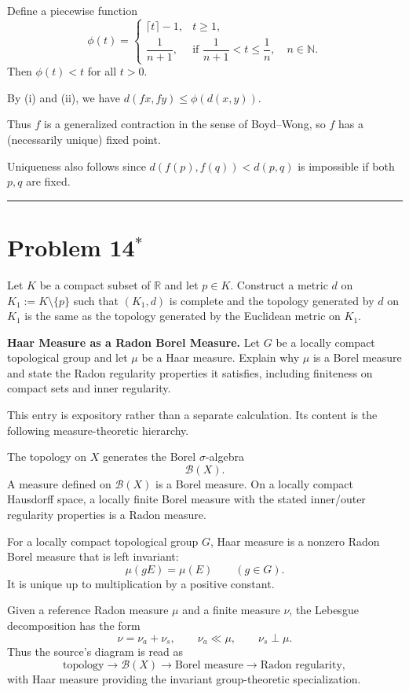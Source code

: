 \begin{solution}
Define a piecewise function
\[
\phi(t)=
\begin{cases}
	\lceil t\rceil - 1, & t\ge 1,\\[3pt]
	\dfrac{1}{n+1}, & \text{if } \dfrac{1}{n+1}<t\le \dfrac{1}{n},\quad n\in\mathbb N.
\end{cases}
\]
Then $\phi(t)<t$ for all $t>0$.

By (i) and (ii), we have $d(fx,fy)\le \phi(d(x,y))$.

Thus $f$ is a generalized contraction in the sense of Boyd--Wong, so
$f$ has a (necessarily unique) fixed point.

Uniqueness also follows since
$d(f(p),f(q))<d(p,q)$ is impossible if both $p,q$ are fixed.

\bigskip
\hrule
\bigskip

\section*{Problem 14$^{\ast}$}
Let $K$ be a compact subset of $\mathbb{R}$ and let $p\in K$. Construct a metric $d$ on
$K_1:=K\setminus\{p\}$ such that $(K_1,d)$ is complete and the topology generated by $d$ on $K_1$
is the same as the topology generated by the Euclidean metric on $K_1$.
\end{solution}

\begin{problem}[CP-II-0393]
\label{prob:cp-ii-0393}
\textbf{Haar Measure as a Radon Borel Measure.}
Let \(G\) be a locally compact topological group and let \(\mu\) be a Haar measure. Explain why \(\mu\) is a Borel measure and state the Radon regularity properties it satisfies, including finiteness on compact sets and inner regularity.
\end{problem}

\begin{solution}
This entry is expository rather than a separate calculation. Its content is the following
measure-theoretic hierarchy.

The topology on \(X\) generates the Borel \(\sigma\)-algebra
\[
\mathcal B(X).
\]
A measure defined on \(\mathcal B(X)\) is a Borel measure. On a locally compact Hausdorff
space, a locally finite Borel measure with the stated inner/outer regularity properties is
a Radon measure.

For a locally compact topological group \(G\), Haar measure is a nonzero Radon Borel measure
that is left invariant:
\[
\mu(gE)=\mu(E)
\qquad(g\in G).
\]
It is unique up to multiplication by a positive constant.

Given a reference Radon measure \(\mu\) and a finite measure \(\nu\), the Lebesgue
decomposition has the form
\[
\boxed{
\nu=\nu_a+\nu_s,
\qquad
\nu_a\ll\mu,
\qquad
\nu_s\perp\mu.
}
\]
Thus the source's diagram is read as
\[
\boxed{
\text{topology}
\longrightarrow
\mathcal B(X)
\longrightarrow
\text{Borel measure}
\longrightarrow
\text{Radon regularity},
}
\]
with Haar measure providing the invariant group-theoretic specialization.
\end{solution}


